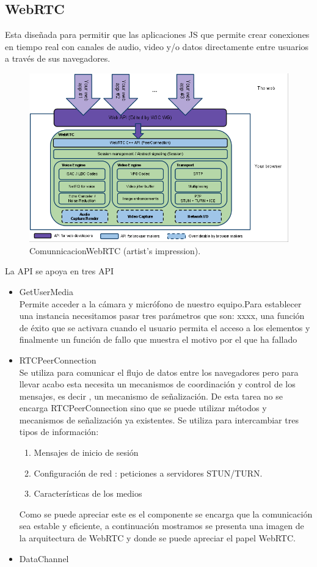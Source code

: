 \subsection{WebRTC}
Esta diseñada para permitir que las aplicaciones JS que permite crear conexiones en tiempo real con canales de audio, video y/o datos directamente entre usuarios a través de sus navegadores.
\begin{figure}[!h]
\centering
\includegraphics[width=0.5\linewidth]{Figures/webrtcdiagram}
\decoRule
\caption[An Electron]{ComunnicacionWebRTC (artist's impression).}
\label{fig:ComunnicacionWebRTC}
\end{figure}
La API se apoya en tres API
\begin{itemize}
\item GetUserMedia \\ Permite acceder a la cámara y micrófono de nuestro equipo.Para establecer una instancia  necesitamos pasar tres parámetros que son:  xxxx, una función de éxito que se activara cuando el usuario permita el acceso a los elementos y finalmente un función de fallo que muestra el motivo por el que ha fallado
\item RTCPeerConnection \\Se utiliza para comunicar el flujo de datos entre los navegadores pero para llevar acabo esta necesita un mecanismos de coordinación y control de los mensajes, es decir , un mecanismo de señalización.
De esta tarea no se encarga RTCPeerConnection sino que se puede utilizar métodos y mecanismos de señalización ya existentes. Se utiliza para intercambiar tres tipos de información: 
\begin{enumerate}
\item Mensajes de inicio de sesión
\item Configuración de red : peticiones a servidores STUN/TURN.
\item Características de los medios
\end{enumerate}
Como se puede apreciar este es el componente se encarga que la comunicación sea estable y eficiente, a continuación mostramos se presenta una imagen de la arquitectura de WebRTC y donde se puede apreciar el papel WebRTC.
\item DataChannel \\
\end{itemize}
